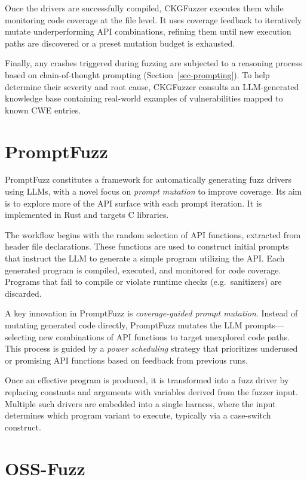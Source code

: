 \documentclass[
  a4paper,
]{scrreprt}
\theoremstyle{definition}
\theoremstyle{remark}
\begin{document}
Once the drivers are successfully compiled, CKGFuzzer executes them
while monitoring code coverage at the file level. It uses coverage
feedback to iteratively mutate underperforming API combinations,
refining them until new execution paths are discovered or a preset
mutation budget is exhausted.

Finally, any crashes triggered during fuzzing are subjected to a
reasoning process based on chain-of-thought prompting
(Section~\ref{sec-prompting}). To help determine their severity and root
cause, CKGFuzzer consults an LLM-generated knowledge base containing
real-world examples of vulnerabilities mapped to known CWE entries.

\section{PromptFuzz}\label{promptfuzz}

PromptFuzz \autocite{lyu2024} constitutes a framework for automatically
generating fuzz drivers using LLMs, with a novel focus on \emph{prompt
mutation} to improve coverage. Its aim is to explore more of the API
surface with each prompt iteration. It is implemented in Rust and
targets C libraries.

The workflow begins with the random selection of API functions,
extracted from header file declarations. These functions are used to
construct initial prompts that instruct the LLM to generate a simple
program utilizing the API. Each generated program is compiled, executed,
and monitored for code coverage. Programs that fail to compile or
violate runtime checks (e.g.~sanitizers) are discarded.

A key innovation in PromptFuzz is \emph{coverage-guided prompt
mutation}. Instead of mutating generated code directly, PromptFuzz
mutates the LLM prompts---selecting new combinations of API functions to
target unexplored code paths. This process is guided by a \emph{power
scheduling} strategy that prioritizes underused or promising API
functions based on feedback from previous runs.

Once an effective program is produced, it is transformed into a fuzz
driver by replacing constants and arguments with variables derived from
the fuzzer input. Multiple such drivers are embedded into a single
harness, where the input determines which program variant to execute,
typically via a case-switch construct.

\section{OSS-Fuzz}\label{sec-oss-fuzz}
\end{document}
